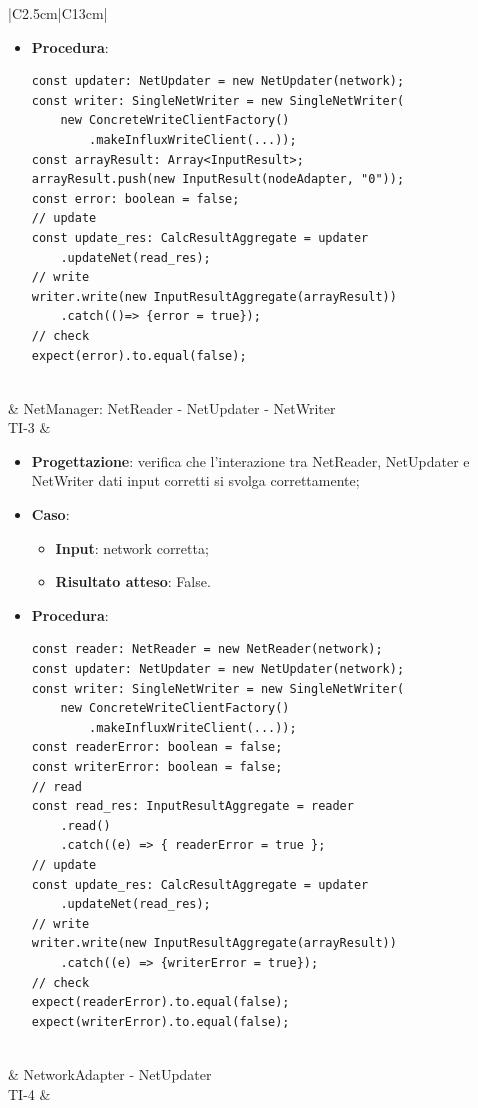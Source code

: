 \begin{longtable}{|C{2.5cm}|C{13cm}|}
\begin{itemize}
		\begin{itemize}
			\item \textbf{Input}: network corretta;
			\item \textbf{Risultato atteso}: False.
		\end{itemize}
		\item \textbf{Procedura}:
		\begin{lstlisting}
const updater: NetUpdater = new NetUpdater(network);
const writer: SingleNetWriter = new SingleNetWriter(
	new ConcreteWriteClientFactory()
		.makeInfluxWriteClient(...));
const arrayResult: Array<InputResult>;
arrayResult.push(new InputResult(nodeAdapter, "0"));
const error: boolean = false;
// update
const update_res: CalcResultAggregate = updater
	.updateNet(read_res);
// write
writer.write(new InputResultAggregate(arrayResult))
	.catch(()=> {error = true});
// check
expect(error).to.equal(false); 
		\end{lstlisting}
	\end{itemize} \\		
	\hline \newpage	\hline
	 & NetManager: NetReader - NetUpdater - NetWriter\\
	\hline	
	{TI-3} & 

	\begin{itemize}
		\item \textbf{Progettazione}: verifica che l'interazione tra NetReader, NetUpdater e NetWriter dati input corretti si svolga correttamente;
		\item \textbf{Caso}: 
		\begin{itemize}
			\item \textbf{Input}: network corretta;
			\item \textbf{Risultato atteso}: False.
		\end{itemize}
		\item \textbf{Procedura}:
		\begin{lstlisting}
const reader: NetReader = new NetReader(network);
const updater: NetUpdater = new NetUpdater(network);
const writer: SingleNetWriter = new SingleNetWriter(
	new ConcreteWriteClientFactory()
		.makeInfluxWriteClient(...));
const readerError: boolean = false;
const writerError: boolean = false;
// read
const read_res: InputResultAggregate = reader
	.read()
	.catch((e) => { readerError = true };
// update
const update_res: CalcResultAggregate = updater
	.updateNet(read_res);
// write
writer.write(new InputResultAggregate(arrayResult))
	.catch((e) => {writerError = true});
// check
expect(readerError).to.equal(false); 
expect(writerError).to.equal(false); 
		\end{lstlisting}
	\end{itemize} \\		
	\hline \newpage	\hline
	 & NetworkAdapter - NetUpdater \\
	\hline	
	{TI-4} & 
	

\end{longtable}
